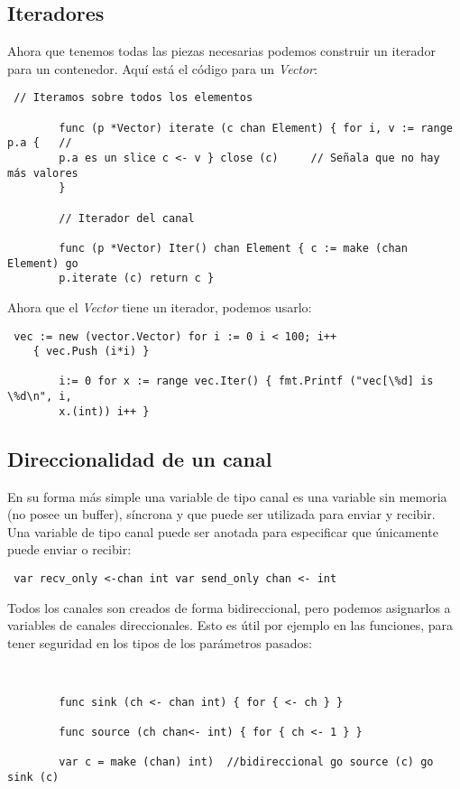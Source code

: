 	\subsection{Iteradores}
	
	Ahora que tenemos todas las piezas necesarias podemos construir un iterador
	para un contenedor. Aquí está el código para un \textit{Vector}: \clearpage
	\begin{verbatim} // Iteramos sobre todos los elementos
	   
		func (p *Vector) iterate (c chan Element) { for i, v := range p.a {   //
		p.a es un slice c <- v } close (c)     // Señala que no hay más valores
		}
	   
		// Iterador del canal
	   
		func (p *Vector) Iter() chan Element { c := make (chan Element) go
		p.iterate (c) return c } \end{verbatim}
	
	Ahora que el \textit{Vector} tiene un iterador, podemos usarlo:
	
	\begin{verbatim} vec := new (vector.Vector) for i := 0 i < 100; i++
	{ vec.Push (i*i) }
	   
		i:= 0 for x := range vec.Iter() { fmt.Printf ("vec[\%d] is \%d\n", i,
		x.(int)) i++ } \end{verbatim}
	
	\subsection{Direccionalidad de un canal}
	
	En su forma más simple una variable de tipo canal es una variable sin
	memoria (no posee un buffer), síncrona y que puede ser utilizada para enviar
	y recibir.\\
	
	Una variable de tipo canal puede ser anotada para especificar que únicamente
	puede enviar o recibir:
	
	\begin{verbatim} var recv_only <-chan int var send_only chan <- int
	\end{verbatim}
	
	Todos los canales son creados de forma bidireccional, pero podemos
	asignarlos a variables de canales direccionales. Esto es útil por ejemplo en
	las funciones, para tener seguridad en los tipos de los parámetros pasados:
	
	\begin{verbatim}
	
	
		func sink (ch <- chan int) { for { <- ch } }
	   
		func source (ch chan<- int) { for { ch <- 1 } }
	   
		var c = make (chan) int)  //bidireccional go source (c) go sink (c)
		\end{verbatim}
	
